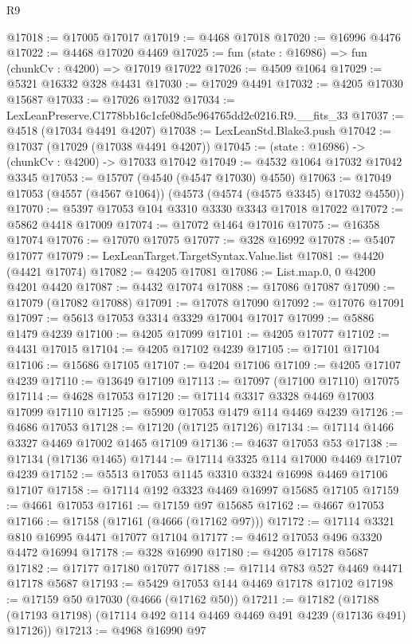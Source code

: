 \begin{lexlean}{R9}
\begin{coremodule}
@17018 := @17005 @17017
@17019 := @4468 @17018
@17020 := @16996 @4476
@17022 := @4468 @17020 @4469
@17025 := fun (state : @16986) => fun (chunkCv : @4200) => @17019 @17022
@17026 := @4509 @1064
@17029 := @5321 @16332 @328 @4431
@17030 := @17029 @4491
@17032 := @4205 @17030 @15687
@17033 := @17026 @17032
@17034 := LexLeanPreserve.C1778bb16c1cfe08d5e964765dd2c0216.R9.__fits_33
@17037 := @4518 (@17034 @4491 @4207)
@17038 := LexLeanStd.Blake3.push
@17042 := @17037 (@17029 (@17038 @4491 @4207))
@17045 := (state : @16986) -> (chunkCv : @4200) -> @17033 @17042
@17049 := @4532 @1064 @17032 @17042 @3345
@17053 := @15707 (@4540 (@4547 @17030) @4550)
@17063 := @17049 @17053 (@4557 (@4567 @1064)) (@4573 (@4574 (@4575 @3345) @17032 @4550))
@17070 := @5397 @17053 @104 @3310 @3330 @3343 @17018 @17022
@17072 := @5862 @4418 @17009
@17074 := @17072 @1464 @17016
@17075 := @16358 @17074
@17076 := @17070 @17075
@17077 := @328 @16992
@17078 := @5407 @17077
@17079 := LexLeanTarget.TargetSyntax.Value.list
@17081 := @4420 (@4421 @17074)
@17082 := @4205 @17081
@17086 := List.map.{0, 0} @4200 @4201 @4420
@17087 := @4432 @17074
@17088 := @17086 @17087
@17090 := @17079 (@17082 @17088)
@17091 := @17078 @17090
@17092 := @17076 @17091
@17097 := @5613 @17053 @3314 @3329 @17004 @17017
@17099 := @5886 @1479 @4239
@17100 := @4205 @17099
@17101 := @4205 @17077
@17102 := @4431 @17015
@17104 := @4205 @17102 @4239
@17105 := @17101 @17104
@17106 := @15686 @17105
@17107 := @4204 @17106
@17109 := @4205 @17107 @4239
@17110 := @13649 @17109
@17113 := @17097 (@17100 @17110) @17075
@17114 := @4628 @17053
@17120 := @17114 @3317 @3328 @4469 @17003 @17099 @17110
@17125 := @5909 @17053 @1479 @114 @4469 @4239
@17126 := @4686 @17053
@17128 := @17120 (@17125 @17126)
@17134 := @17114 @1466 @3327 @4469 @17002 @1465 @17109
@17136 := @4637 @17053 @53
@17138 := @17134 (@17136 @1465)
@17144 := @17114 @3325 @114 @17000 @4469 @17107 @4239
@17152 := @5513 @17053 @1145 @3310 @3324 @16998 @4469 @17106 @17107
@17158 := @17114 @192 @3323 @4469 @16997 @15685 @17105
@17159 := @4661 @17053
@17161 := @17159 @97 @15685
@17162 := @4667 @17053
@17166 := @17158 (@17161 (@4666 (@17162 @97)))
@17172 := @17114 @3321 @810 @16995 @4471 @17077 @17104
@17177 := @4612 @17053 @496 @3320 @4472 @16994
@17178 := @328 @16990
@17180 := @4205 @17178 @5687
@17182 := @17177 @17180 @17077
@17188 := @17114 @783 @527 @4469 @4471 @17178 @5687
@17193 := @5429 @17053 @144 @4469 @17178 @17102
@17198 := @17159 @50 @17030 (@4666 (@17162 @50))
@17211 := @17182
    (@17188 (@17193 @17198) (@17114 @492 @114 @4469 @4469 @491 @4239 (@17136 @491) @17126))
@17213 := @4968 @16990 @97

\end{coremodule}
\end{lexlean}
